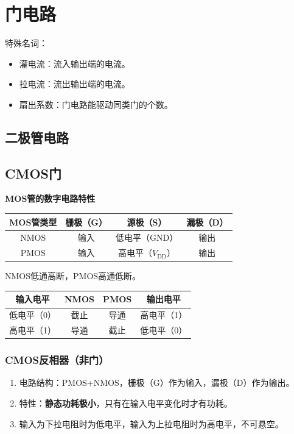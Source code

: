 \documentclass[UTF8,fontset=fandol,zihao=5]{ctexart}
\begin{document}
\section{门电路}

特殊名词：
\begin{itemize}
  \item 灌电流：流入输出端的电流。
  \item 拉电流：流出输出端的电流。
  \item 扇出系数：门电路能驱动同类门的个数。
\end{itemize}

\subsection{二极管电路}

\subsection{CMOS门}

\textbf{MOS管的数字电路特性}

\begin{table}[htbp]
  \centering
  \begin{tabular}{cccc}
    \toprule
    MOS管类型 & 栅极（G） & 源极（S） & 漏极（D） \\
    \midrule
    NMOS & 输入 & 低电平（GND） & 输出 \\
    PMOS & 输入 & 高电平（$V_{\mathrm{DD}}$） & 输出 \\
    \bottomrule
  \end{tabular}
\end{table}
NMOS低通高断，PMOS高通低断。
\begin{table}[htbp]
  \centering
  \begin{tabular}{cccc}
    \toprule
    输入电平 & NMOS & PMOS & 输出电平 \\
    \midrule
    低电平（0） & 截止 & 导通 & 高电平（1） \\
    高电平（1） & 导通 & 截止 & 低电平（0） \\
    \bottomrule
  \end{tabular}
\end{table}

\subsubsection{CMOS反相器（非门）}

\begin{enumerate}
  \item 电路结构：PMOS+NMOS，栅极（G）作为输入，漏极（D）作为输出。
  \item 特性：\textbf{静态功耗极小}，只有在输入电平变化时才有功耗。
  \item 输入为下拉电阻时为低电平，输入为上拉电阻时为高电平，不可悬空。
\end{enumerate}
\end{document}
